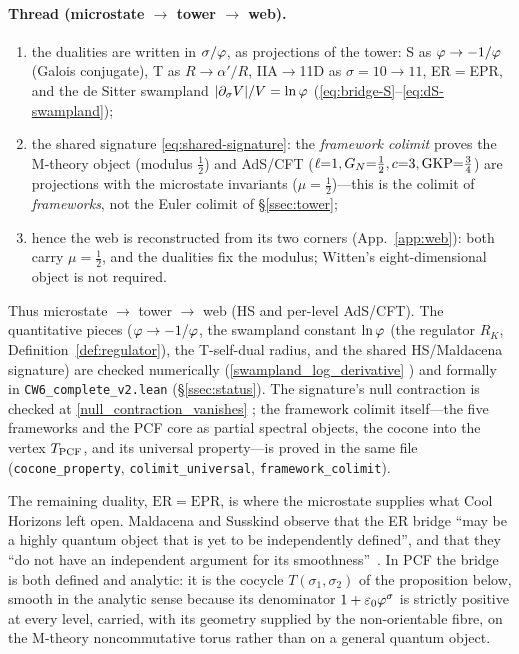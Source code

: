 \paragraph{Thread (microstate $\to$ tower $\to$ web).}
\begin{enumerate}
  \item the dualities are written in $\sigma/\varphi$, as projections of the tower: S as
        $\varphi\to-1/\varphi$ (Galois conjugate), T as $R\to\alpha'/R$, IIA$\to$11D as $\sigma=10\to11$,
        ER$=$EPR, and the de Sitter swampland $|\partial_{\sigma}V|/V=\ln\varphi$
        (\eqref{eq:bridge-S}--\eqref{eq:dS-swampland});
  \item the shared signature \eqref{eq:shared-signature}: the \emph{framework colimit} proves the
        M-theory object
        (modulus $\tfrac12$) and AdS/CFT ($\ell{=}1,G_{N}{=}\tfrac12,c{=}3,\mathrm{GKP}{=}\tfrac34$) are
        projections with the microstate invariants ($\mu=\tfrac12$)---this is the colimit of
        \emph{frameworks}, not the Euler colimit of \S\ref{ssec:tower};
  \item hence the web is reconstructed from its two corners (App.~\ref{app:web}): both carry $\mu=\tfrac12$, and
        the dualities fix the modulus; Witten's eight-dimensional object is not required.
\end{enumerate}
Thus microstate $\to$ tower $\to$ web (HS and per-level AdS/CFT). The quantitative pieces
($\varphi\to-1/\varphi$, the swampland constant $\ln\varphi$ (the regulator $R_K$,
Definition~\ref{def:regulator}), the T-self-dual radius, and the
shared HS/Maldacena signature) are checked numerically (\eqref{swampland_log_derivative} )
and formally in \texttt{CW6\_complete\_v2.lean} (\S\ref{ssec:status}). The signature's null contraction is checked at \eqref{null_contraction_vanishes} ; the framework colimit
itself---the five frameworks and the PCF core as partial spectral objects, the cocone into the
vertex $T_{\mathrm{PCF}}$, and its universal property---is proved in the same file
(\texttt{cocone\_property}, \texttt{colimit\_universal}, \texttt{framework\_colimit}).


The remaining duality, $\mathrm{ER}=\mathrm{EPR}$, is where the microstate supplies what
Cool Horizons left open. Maldacena and Susskind observe that the ER bridge ``may be a highly
quantum object that is yet to be independently defined'', and that they ``do not have an
independent argument for its smoothness''~\cite{MaldacenaSusskind13}. In PCF the bridge is
both defined and analytic: it is the cocycle $T(\sigma_1,\sigma_2)$ of the proposition below,
smooth in the analytic sense because its denominator $1+\varepsilon_0\varphi^{\sigma}$ is strictly positive at
every level, carried, with its geometry supplied by the non-orientable fibre, on the M-theory
noncommutative torus rather than on a general quantum object.

